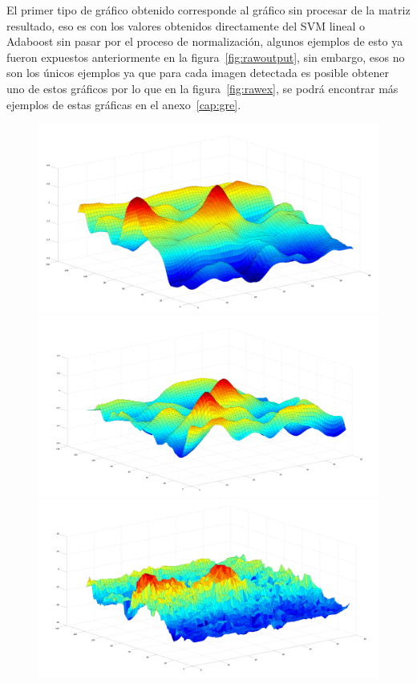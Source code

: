 El primer tipo de gráfico obtenido corresponde al gráfico sin procesar de la matriz resultado, eso es con los valores obtenidos directamente del SVM lineal o Adaboost sin pasar por el proceso de normalización, algunos ejemplos de esto ya fueron expuestos anteriormente en la figura~\ref{fig:rawoutput}, sin embargo, esos no son los únicos ejemplos ya que para cada imagen detectada  es posible obtener uno de estos gráficos por lo que en la figura~\ref{fig:rawex}, se podrá encontrar más ejemplos de estas gráficas en el anexo~\ref{cap:gre}.

\begin{figure}[H]
  \centering
  \includegraphics[scale=.1]{images/raw/1}
  \includegraphics[scale=.1]{images/raw/2}
  \includegraphics[scale=.1]{images/raw/3}

\end{figure}
